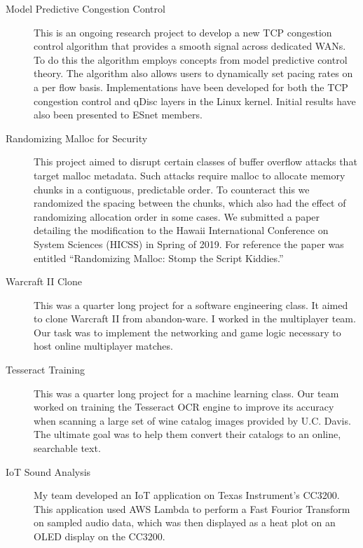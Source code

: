 \documentclass{article}
\begin{document}
\begin{description}
    \item[Model Predictive Congestion Control]
        This is an ongoing research project to develop a new TCP congestion
        control algorithm that provides a smooth signal across dedicated WANs.
        To do this the algorithm employs concepts from model predictive control
        theory.
        The algorithm also allows users to dynamically set pacing rates on a per
        flow basis.
        Implementations have been developed for both the TCP congestion control
        and qDisc layers in the Linux kernel.
        Initial results have also been presented to ESnet members.

    \item[Randomizing Malloc for Security]
        This project aimed to disrupt certain classes of buffer overflow attacks
        that target malloc metadata.
        Such attacks require malloc to allocate memory chunks in a contiguous,
        predictable order.
        To counteract this we randomized the spacing between the chunks, which
        also had the effect of randomizing allocation order in some cases.
        We submitted a paper detailing the modification to the Hawaii
        International Conference on System Sciences (HICSS) in Spring of 2019.
        For reference the paper was entitled ``Randomizing Malloc: Stomp the
        Script Kiddies.''

    \item[Warcraft II Clone]
        This was a quarter long project for a software engineering class.
        It aimed to clone Warcraft II from abandon-ware.
        I worked in the multiplayer team.
        Our task was to implement the networking and game logic necessary to
        host online multiplayer matches.

    \item[Tesseract Training]
        This was a quarter long project for a machine learning class.
        Our team worked on training the Tesseract OCR engine to improve its
        accuracy when scanning a large set of wine catalog images provided by
        U.C.  Davis.
        The ultimate goal was to help them convert their catalogs to an online,
        searchable text.

    \item[IoT Sound Analysis]
        My team developed an IoT application on Texas Instrument's CC3200.
        This application used AWS Lambda to perform a Fast Fourior
        Transform on sampled audio data, which was then displayed as a
        heat plot on an OLED display on the CC3200.
\end{description}
\end{document}
